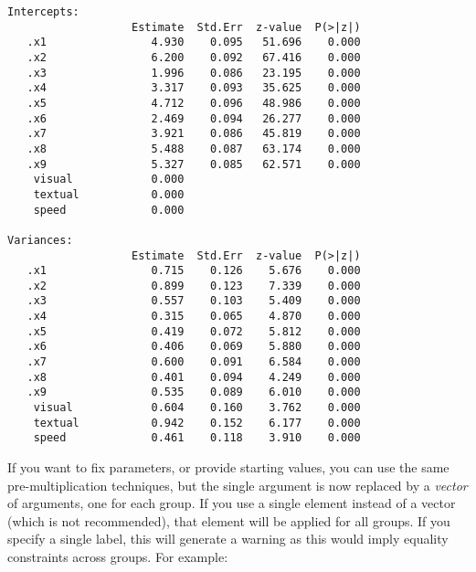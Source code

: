 \begin{verbatim}
Intercepts:
                   Estimate  Std.Err  z-value  P(>|z|)
   .x1                4.930    0.095   51.696    0.000
   .x2                6.200    0.092   67.416    0.000
   .x3                1.996    0.086   23.195    0.000
   .x4                3.317    0.093   35.625    0.000
   .x5                4.712    0.096   48.986    0.000
   .x6                2.469    0.094   26.277    0.000
   .x7                3.921    0.086   45.819    0.000
   .x8                5.488    0.087   63.174    0.000
   .x9                5.327    0.085   62.571    0.000
    visual            0.000                           
    textual           0.000                           
    speed             0.000                           

Variances:
                   Estimate  Std.Err  z-value  P(>|z|)
   .x1                0.715    0.126    5.676    0.000
   .x2                0.899    0.123    7.339    0.000
   .x3                0.557    0.103    5.409    0.000
   .x4                0.315    0.065    4.870    0.000
   .x5                0.419    0.072    5.812    0.000
   .x6                0.406    0.069    5.880    0.000
   .x7                0.600    0.091    6.584    0.000
   .x8                0.401    0.094    4.249    0.000
   .x9                0.535    0.089    6.010    0.000
    visual            0.604    0.160    3.762    0.000
    textual           0.942    0.152    6.177    0.000
    speed             0.461    0.118    3.910    0.000
\end{verbatim}

If you want to fix parameters, or provide starting values, you can use
the same pre-multiplication techniques, but the single argument is now
replaced by a \emph{vector} of arguments, one for each group. If you use
a single element instead of a vector (which is not recommended), that
element will be applied for all groups. If you specify a single label,
this will generate a warning as this would imply equality constraints
across groups. For example:

\begin{Shaded}
\begin{Highlighting}[]
\OtherTok{\textless{}{-}} 
\end{Highlighting}
\end{Shaded}

